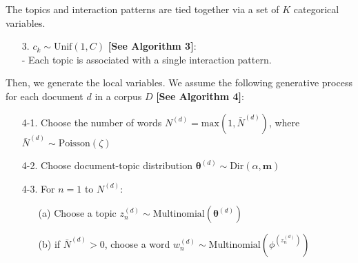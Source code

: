 \documentclass[a4paper]{article}
\begin{document}
\noindent The topics and interaction patterns are tied together via a set of $K$ categorical variables.
\begin{itemize}
	\item[3.] $c_k\sim \mbox{Unif}(1, C)$ \textbf{[See Algorithm 3]}: \\
	- Each topic is associated with a single interaction pattern.\\
\end{itemize}
\noindent Then, we generate the local variables. We assume the following generative process for each document $d$ in a corpus $D$ \textbf{[See Algorithm 4]}:
\begin{itemize}
	\item[4-1.] Choose the number of words $N^{(d)} = \mbox{max}(1, \bar N^{(d)})$, where $\bar N^{(d)}\sim \mbox{Poisson}(\zeta)$
	\item[4-2.] Choose document-topic distribution $\boldsymbol{\theta}^{(d)}\sim \mbox{Dir}(\alpha, \boldsymbol{m})$
	\item[4-3.] For $n=1$ to $N^{(d)}$:
	\begin{itemize}
		\item[(a)] Choose a topic $z_n^{(d)} \sim \mbox{Multinomial}(\boldsymbol{\theta}^{(d)})$
		\item[(b)] if $\bar N^{(d)}>0$, choose a word $w_n^{(d)} \sim\mbox{Multinomial} (\phi^{(z_n^{(d)})})$
	\end{itemize}
\end{itemize}
\end{document}
